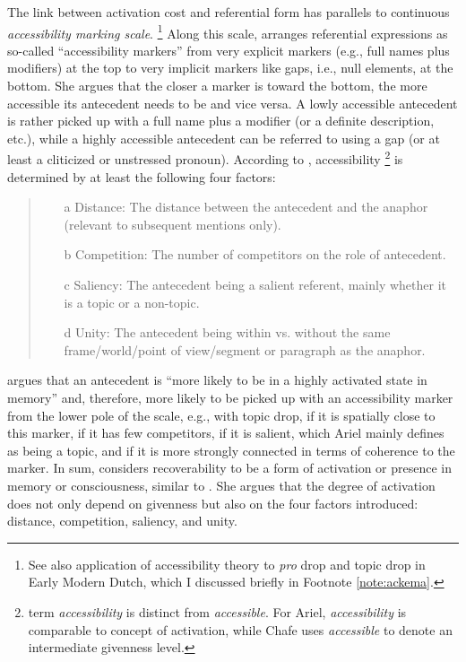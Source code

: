 The link between activation cost and referential form has parallels to  continuous \textit{accessibility marking scale}.%
\footnote{See also  application of  accessibility theory to \textit{pro} drop  and topic drop in Early Modern Dutch,  which I discussed briefly in Footnote \ref{note:ackema}.
}
Along this scale, \citet[73]{ariel1990}  arranges referential expressions as so-called ``accessibility markers'' from very explicit markers (e.g., full names plus modifiers) at the top to very implicit markers like gaps, i.e., null elements, at the bottom.
She argues that the closer a marker is toward the bottom, the more accessible its antecedent   needs to be and vice versa.
A lowly accessible antecedent  is rather picked up with a full name plus a modifier (or a definite description, etc.), while a highly accessible antecedent can be referred to using a gap (or at least a cliticized or unstressed pronoun).
According to \citet{ariel1990}, accessibility%
\footnote{ term \textit{accessibility} is distinct from  \textit{accessible}.
For Ariel, \textit{accessibility} is comparable to  concept of activation, while Chafe uses \textit{accessible} to denote an intermediate givenness level.
}
%
is determined by at least the following four factors:

\begin{quote}
\begin{enumerate}
\item[a] Distance: The distance between the antecedent and the anaphor (relevant to subsequent mentions only).
\item[b] Competition: The number of competitors on the role of antecedent.
\item[c]	 Saliency: The antecedent being a salient referent, mainly whether it is a topic or a non-topic.  
\item[d] Unity: The antecedent being within vs. without the same frame\slash world\slash point of view\slash segment or paragraph as the anaphor. \citep[28--29]{ariel1990}
\end{enumerate}
\end{quote}

\noindent
\citet[29]{ariel1990} argues that an antecedent is ``more likely to be in a highly activated state in memory'' and, therefore, more likely to be picked up with an accessibility marker from the lower pole of the scale, e.g., with topic drop, if it is spatially close to this marker, if it has few competitors, if it is salient, which Ariel mainly defines as being a topic, and if it is more strongly connected in terms of coherence to the marker.
In sum, \citet{ariel1990} considers recoverability to be a form of activation or presence in memory or consciousness, similar to \citet{chafe1994}.
She argues that the degree of activation does not only depend on givenness but also on the four factors introduced: distance, competition, saliency,  and unity.

